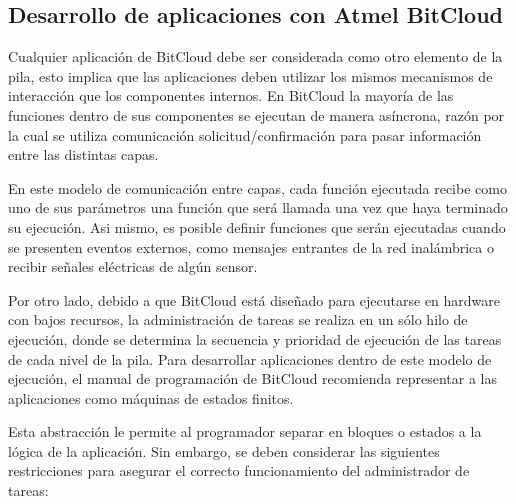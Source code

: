 
\subsection{Desarrollo de aplicaciones con Atmel BitCloud}

Cualquier aplicación de BitCloud debe ser considerada como otro elemento de la pila, esto implica que las aplicaciones deben utilizar los mismos mecanismos de interacción que los componentes internos. En BitCloud la mayoría de las funciones dentro de sus componentes se ejecutan de manera asíncrona, razón por la cual se utiliza comunicación solicitud/confirmación para pasar información entre las distintas capas. 

En este modelo de comunicación entre capas, cada función ejecutada recibe como uno de sus parámetros una función que será llamada una vez que haya terminado su ejecución. Asi mismo, es posible definir funciones que serán ejecutadas cuando se presenten eventos externos, como mensajes entrantes de la red inalámbrica o recibir señales eléctricas de algún sensor.   

Por otro lado, debido a que BitCloud está diseñado para ejecutarse en hardware con bajos recursos, la administración de tareas se realiza en un sólo hilo de ejecución, donde se determina la secuencia y prioridad de ejecución de las tareas de cada nivel de la pila. Para desarrollar aplicaciones dentro de este modelo de ejecución, el manual de programación de BitCloud recomienda representar a las aplicaciones como máquinas de estados finitos. 

Esta abstracción le permite al programador separar en bloques o estados a la lógica de la aplicación. Sin embargo, se deben considerar las siguientes restricciones para asegurar el correcto funcionamiento del administrador de tareas: 


